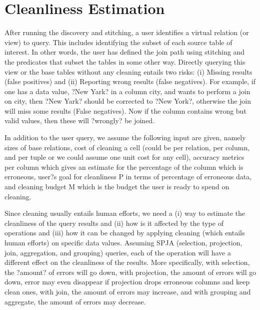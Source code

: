 \section{Cleanliness Estimation}
\label{sec:cleanliness}

After running the  discovery and stitching, a user identifies a virtual relation (or view) to query.  This includes identifying the subset of each source table of interest.  In other words, the user has defined the join path using stitching and the predicates that subset the tables in some other way.   Directly querying this view or the base tables without any cleaning entails two risks: (i) Missing results (false positives) and (ii) Reporting wrong results (false negatives). For example,  if one has a data value, ?New Yark? in a column city, and wants to perform a join on city, then ?New Yark? should be corrected to ?New York?, otherwise the join will miss some results (False negatives). Now if the column contains wrong but valid values, then these will ?wrongly? be joined. 

In addition to the user query, we assume the following input are given, namely sizes of base relations, cost of cleaning a cell (could be per relation, per column, and per tuple or we could assume one unit cost for any cell),  accuracy metrics per column which gives an estimate for the percentage of the column which is erroneous,  user?s goal for cleanliness P in terms of percentage of erroneous data,  and cleaning budget M which is the budget the user is ready to spend on cleaning.

Since cleaning usually entails human efforts, we need a (i) way to estimate the cleanliness of the query results and (ii) how is it affected by the type of operations and (iii) how it can be changed by applying cleaning (which entails human efforts) on specific data values. Assuming SPJA (selection, projection, join, aggregation, and grouping) queries, each of the operation will have a different effect on the cleanliness of the results. More specifically,  with selection, the ?amount? of errors will go down, with projection,  the amount of errors will go down, error may even disappear if projection drops erroneous columns and keep clean ones, with join, the amount of errors may increase, and with grouping and aggregate, the amount of errors may decrease. 

